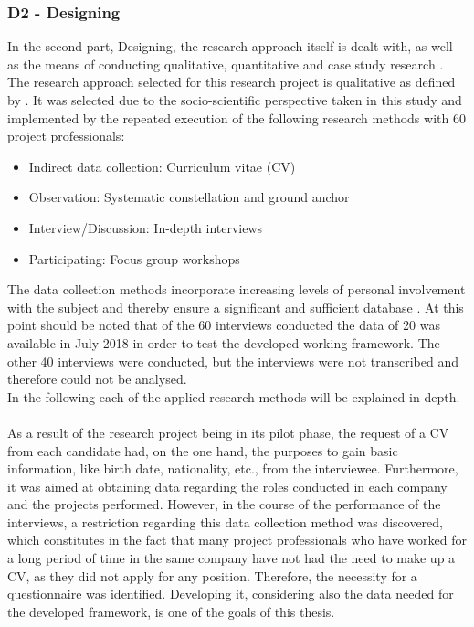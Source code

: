 \subsubsection{D2 - Designing}
In the second part, Designing, the research approach itself is dealt with, as well as the means of conducting qualitative, quantitative and case study research \cite{maylor17}. \\
The research approach selected for this research project is qualitative as defined by . It was selected due to the socio-scientific perspective taken in this study and implemented by the repeated execution of the following research methods with 60 project professionals: 
\begin{itemize}[itemsep=0.05cm]
    \item Indirect data collection: Curriculum vitae (CV)
    \item Observation: Systematic constellation and ground anchor
    \item Interview/Discussion: In-depth interviews
    \item Participating: Focus group workshops
\end{itemize}
The data collection methods incorporate increasing levels of personal involvement with the subject and thereby ensure a significant and sufficient database \cite{maylor17}. At this point should be noted that of the 60 interviews conducted the data of 20 was available in July 2018 in order to test the developed working framework. The other 40 interviews were conducted, but the interviews were not transcribed and therefore could not be analysed.\\
In the following each of the applied research methods will be explained in depth.\\

\\[.1cm]
As a result of the research project being in its pilot phase, the request of a CV from each candidate had, on the one hand, the purposes to gain basic information, like birth date, nationality, etc.,  from the interviewee. Furthermore, it was aimed at obtaining data regarding the roles conducted in each company and the projects performed. However, in the course of the performance of the interviews, a restriction regarding this data collection method was discovered, which constitutes in the fact that many project professionals who have worked for a long period of time in the same company have not had the need to make up a CV, as they did not apply for any position. Therefore, the necessity for a questionnaire  was identified. Developing it, considering also the data needed for the developed framework, is one of the goals of this thesis.\\ 

